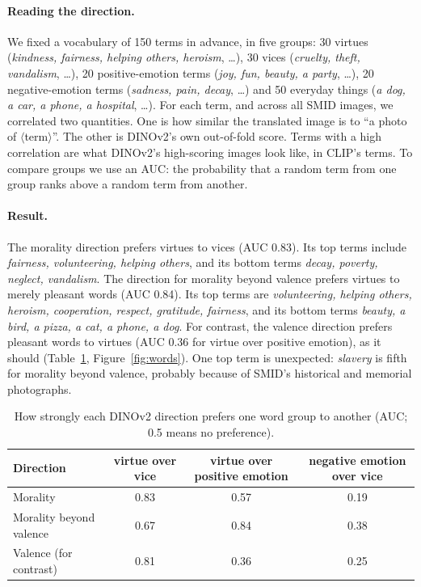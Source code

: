 \documentclass[11pt]{article}
\begin{document}
\paragraph{Reading the direction.} We fixed a vocabulary of 150 terms in advance, in five groups: 30 virtues (\emph{kindness, fairness, helping others, heroism}, \dots), 30 vices (\emph{cruelty, theft, vandalism}, \dots), 20 positive-emotion terms (\emph{joy, fun, beauty, a party}, \dots), 20 negative-emotion terms (\emph{sadness, pain, decay}, \dots) and 50 everyday things (\emph{a dog, a car, a phone, a hospital}, \dots). For each term, and across all SMID images, we correlated two quantities. One is how similar the translated image is to ``a photo of $\langle$term$\rangle$''. The other is DINOv2's own out-of-fold score. Terms with a high correlation are what DINOv2's high-scoring images look like, in CLIP's terms. To compare groups we use an AUC: the probability that a random term from one group ranks above a random term from another.

\paragraph{Result.} The morality direction prefers virtues to vices (AUC 0.83). Its top terms include \emph{fairness, volunteering, helping others}, and its bottom terms \emph{decay, poverty, neglect, vandalism}. The direction for morality beyond valence prefers virtues to merely pleasant words (AUC 0.84). Its top terms are \emph{volunteering, helping others, heroism, cooperation, respect, gratitude, fairness}, and its bottom terms \emph{beauty, a bird, a pizza, a cat, a phone, a dog}. For contrast, the valence direction prefers pleasant words to virtues (AUC 0.36 for virtue over positive emotion), as it should (Table~\ref{tab:words}, Figure~\ref{fig:words}). One top term is unexpected: \emph{slavery} is fifth for morality beyond valence, probably because of SMID's historical and memorial photographs.

\begin{table}[ht]\centering\small
\begin{tabular}{lccc}\toprule
Direction & virtue over vice & virtue over positive emotion & negative emotion over vice\\\midrule
Morality & 0.83 & 0.57 & 0.19\\
Morality beyond valence & 0.67 & 0.84 & 0.38\\
Valence (for contrast) & 0.81 & 0.36 & 0.25\\\bottomrule
\end{tabular}
\caption{How strongly each DINOv2 direction prefers one word group to another (AUC; 0.5 means no preference).}\label{tab:words}
\end{table}
\end{document}
